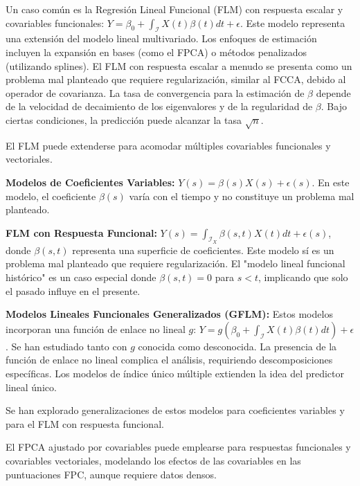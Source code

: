 \documentclass{article}
\begin{document}
\vspace{0.35cm}\noindent
Un caso común es la Regresión Lineal Funcional (FLM) con respuesta escalar y covariables funcionales: $Y = \beta_0 + \int_{\mathcal{I}} X(t)\beta(t)dt + \epsilon$. Este modelo representa una extensión del modelo lineal multivariado. Los enfoques de estimación incluyen la expansión en bases (como el FPCA) o métodos penalizados (utilizando splines). El FLM con respuesta escalar a menudo se presenta como un problema mal planteado que requiere regularización, similar al FCCA, debido al operador de covarianza. La tasa de convergencia para la estimación de $\beta$ depende de la velocidad de decaimiento de los eigenvalores y de la regularidad de $\beta$. Bajo ciertas condiciones, la predicción puede alcanzar la tasa $\sqrt{n}$.

\vspace{0.35cm}\noindent
El FLM puede extenderse para acomodar múltiples covariables funcionales y vectoriales.

\vspace{0.35cm}\noindent
\textbf{Modelos de Coeficientes Variables:} $Y(s) = \beta(s)X(s) + \epsilon(s)$. En este modelo, el coeficiente $\beta(s)$ varía con el tiempo y no constituye un problema mal planteado.

\vspace{0.35cm}\noindent
\textbf{FLM con Respuesta Funcional:} $Y(s) = \int_{\mathcal{I}_X} \beta(s, t)X(t)dt + \epsilon(s)$, donde $\beta(s,t)$ representa una superficie de coeficientes. Este modelo sí es un problema mal planteado que requiere regularización. El "modelo lineal funcional histórico" es un caso especial donde $\beta(s,t) = 0$ para $s < t$, implicando que solo el pasado influye en el presente.

\vspace{0.35cm}\noindent
\textbf{Modelos Lineales Funcionales Generalizados (GFLM):} Estos modelos incorporan una función de enlace no lineal $g$: $Y = g(\beta_0 + \int_{\mathcal{I}} X(t)\beta(t)dt) + \epsilon$. Se han estudiado tanto con $g$ conocida como desconocida. La presencia de la función de enlace no lineal complica el análisis, requiriendo descomposiciones específicas. Los modelos de índice único múltiple extienden la idea del predictor lineal único.

\vspace{0.35cm}\noindent
Se han explorado generalizaciones de estos modelos para coeficientes variables y para el FLM con respuesta funcional.

\vspace{0.35cm}\noindent
El FPCA ajustado por covariables puede emplearse para respuestas funcionales y covariables vectoriales, modelando los efectos de las covariables en las puntuaciones FPC, aunque requiere datos densos.
\end{document}

